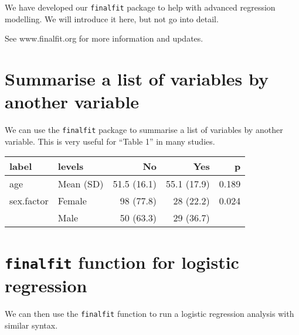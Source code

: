 \documentclass[]{book}
\makeatletter
\newenvironment{Shaded}{\begin{snugshade}}{\end{snugshade}}
\newcommand{\KeywordTok}[1]{\textcolor[rgb]{0.13,0.29,0.53}{\textbf{#1}}}
\newcommand{\DataTypeTok}[1]{\textcolor[rgb]{0.13,0.29,0.53}{#1}}
\newcommand{\StringTok}[1]{\textcolor[rgb]{0.31,0.60,0.02}{#1}}
\newcommand{\OtherTok}[1]{\textcolor[rgb]{0.56,0.35,0.01}{#1}}
\newcommand{\OperatorTok}[1]{\textcolor[rgb]{0.81,0.36,0.00}{\textbf{#1}}}
\newcommand{\NormalTok}[1]{#1}
\newenvironment{kframe}{%
\medskip{}
\setlength{\fboxsep}{.8em}
 \def\at@end@of@kframe{}%
 \ifinner\ifhmode%
  \def\at@end@of@kframe{\end{minipage}}%
  \begin{minipage}{\columnwidth}%
 \fi\fi%
 \def\FrameCommand##1{\hskip\@totalleftmargin \hskip-\fboxsep
 \colorbox{shadecolor}{##1}\hskip-\fboxsep
     \hskip-\linewidth \hskip-\@totalleftmargin \hskip\columnwidth}%
 \MakeFramed {\advance\hsize-\width
   \@totalleftmargin\z@ \linewidth\hsize
   \@setminipage}}%
 {\par\unskip\endMakeFramed%
 \at@end@of@kframe}
\renewenvironment{Shaded}{\begin{kframe}}{\end{kframe}}
\theoremstyle{definition}
\theoremstyle{definition}
\theoremstyle{definition}
\theoremstyle{remark}
\makeatother
\begin{document}
We have developed our \texttt{finalfit} package to help with advanced
regression modelling. We will introduce it here, but not go into detail.

See www.finalfit.org for more information and updates.

\section{Summarise a list of variables by another
variable}\label{summarise-a-list-of-variables-by-another-variable}

We can use the \texttt{finalfit} package to summarise a list of
variables by another variable. This is very useful for ``Table 1'' in
many studies.

\begin{Shaded}
\end{Shaded}

\begin{tabular}{l|l|r|r|r}
\hline
label & levels & No & Yes & p\\
\hline
age & Mean (SD) & 51.5 (16.1) & 55.1 (17.9) & 0.189\\
\hline
sex.factor & Female & 98 (77.8) & 28 (22.2) & 0.024\\
\hline
 & Male & 50 (63.3) & 29 (36.7) & \\
\hline
\end{tabular}

\section{\texorpdfstring{\texttt{finalfit} function for logistic
regression}{finalfit function for logistic regression}}\label{finalfit-function-for-logistic-regression}

We can then use the \texttt{finalfit} function to run a logistic
regression analysis with similar syntax.
\end{document}
